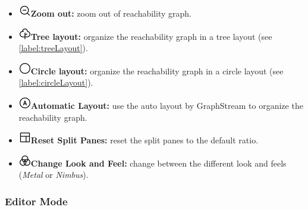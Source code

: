 \documentclass[10pt, a4paper]{article}
\begin{document}
\begin{itemize}
\item\includegraphics[scale=0.4]{../../src/resources/images/Toolbar/zoom-out.png}\hspace{0.1cm}\textbf{Zoom out:} zoom out of reachability graph.
\item\includegraphics[scale=0.4]{../../src/resources/images/Toolbar/tree-layout.png}\hspace{0.1cm}\textbf{Tree layout:} organize the reachability graph in a tree layout (see \ref{label:treeLayout}).
\item\includegraphics[scale=0.4]{../../src/resources/images/Toolbar/circle-layout.png}\hspace{0.1cm}\textbf{Circle layout:} organize the reachability graph in a circle layout (see \ref{label:circleLayout}).
\item\includegraphics[scale=0.4]{../../src/resources/images/Toolbar/auto-layout.png}\hspace{0.1cm}\textbf{Automatic Layout:} use the auto layout by GraphStream to organize the reachability graph.
\item\includegraphics[scale=0.4]{../../src/resources/images/Toolbar/layout.png}\hspace{0.1cm}\textbf{Reset Split Panes:} reset the split panes to the default ratio.
\item\includegraphics[scale=0.4]{../../src/resources/images/Toolbar/design.png}\hspace{0.1cm}\textbf{Change Look and Feel:} change between the different look and feels (\textit{Metal} or \textit{Nimbus}).
\end{itemize} 

\subsubsection{Editor Mode}
\label{label:editor}
\end{document}
